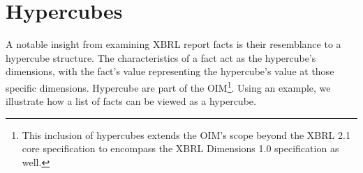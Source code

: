 \section{Hypercubes}
\label{sec:hypercubes}

A notable insight from examining XBRL report facts is their resemblance to a hypercube structure.
The characteristics of a fact act as the hypercube's dimensions, with the fact's value representing the hypercube's value at those specific dimensions.
Hypercube are part of the OIM\footnote{This inclusion of hypercubes extends the OIM's\cite{oim} scope beyond the XBRL 2.1 core specification\cite{xbrl21} to encompass the XBRL Dimensions 1.0 specification\cite{xbrl_dimensions} as well.}.
Using an example, we illustrate how a list of facts can be viewed as a hypercube.


